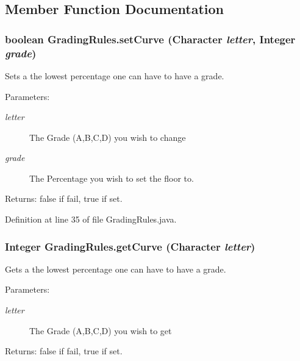 \subsection{Member Function Documentation}
\hypertarget{classGradingRules_a598ad97fc49367e792bb932b048477a}{
\subsubsection{\setlength{\rightskip}{0pt plus 5cm}boolean GradingRules.setCurve (Character {\em letter}, \/  Integer {\em grade})}}
\label{classGradingRules_a598ad97fc49367e792bb932b048477a}


Sets a the lowest percentage one can have to have a grade. 

\begin{Desc}
\item[Parameters:]
\begin{description}
\item[{\em letter}]The Grade (A,B,C,D) you wish to change \item[{\em grade}]The Percentage you wish to set the floor to. \end{description}
\end{Desc}
\begin{Desc}
\item[Returns:]false if fail, true if set. \end{Desc}


Definition at line 35 of file GradingRules.java.\hypertarget{classGradingRules_1efd3c9e8bc3c4df7d1851454fb74784}{
\subsubsection{\setlength{\rightskip}{0pt plus 5cm}Integer GradingRules.getCurve (Character {\em letter})}}
\label{classGradingRules_1efd3c9e8bc3c4df7d1851454fb74784}


Gets a the lowest percentage one can have to have a grade. 

\begin{Desc}
\item[Parameters:]
\begin{description}
\item[{\em letter}]The Grade (A,B,C,D) you wish to get \end{description}
\end{Desc}
\begin{Desc}
\item[Returns:]false if fail, true if set. \end{Desc}


